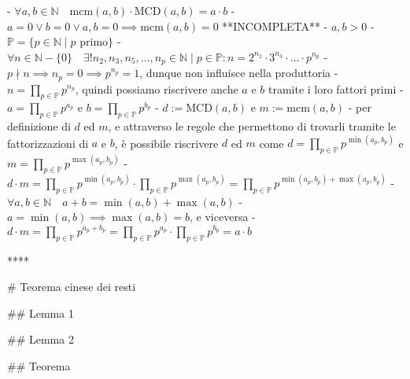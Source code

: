 - $\forall a, b \in \mathbb{N} \quad \textrm{mcm}(a, b) \cdot \textrm{MCD}(a, b) = a \cdot b$
  - $a = 0 \lor b = 0 \lor a, b = 0 \implies \textrm{mcm}(a, b) = 0$ **INCOMPLETA**
  - $a, b \gt 0$
    - $\mathbb{P} = \{p \in \mathbb{N} \mid p \textrm{ primo}\}$
    - $\forall n \in \mathbb{N} - \{0\} \quad \exists ! n_2, n_3, n_5, \ldots, n_p \in \mathbb{N} \mid p \in \mathbb{P} : n = 2^{n_2} \cdot 3 ^ {n_3} \cdot \ldots \cdot p ^ {n_p}$
      - $p \nmid n \implies n_p = 0 \implies p ^  {n_p} = 1$, dunque non influisce nella produttoria
    - $\displaystyle{n = \prod_{p \in \mathbb{P}}^{} p ^{n_p}}$, quindi possiamo riscrivere anche $a$ e $b$ tramite i loro fattori primi
      - \(\displaystyle{a=\prod_{p \in \mathbb{P}} p^{a_{p}}} \) e \( \displaystyle{b=\prod_{p \in \mathbb{P}} p^{b_{p}} }\)
    - $d:= \textrm{MCD}(a, b)$ e $m:=\textrm{mcm}(a, b)$
      - per definizione di $d$ ed $m$, e attraverso le regole che permettono di trovarli tramite le fattorizzazioni di $a$ e $b$, è possibile riscrivere $d$ ed $m$ come $\displaystyle{d = \prod_{p \in \mathbb{P}} p^{\min(a_p, b_p)}}$ e $\displaystyle{m = \prod_{p \in \mathbb{P}} p^{\max(a_p, b_p)}}$
      - $d \cdot m =\displaystyle{\prod_{p \in \mathbb{P}} p^{\min(a_p, b_p)}} \cdot \displaystyle{\prod_{p \in \mathbb{P}} p^{\max(a_p, b_p)}} = \displaystyle{\prod_{p \in \mathbb{P}} p^{\min(a_p, b_p) + \max(a_p, b_p)}}$
    - $\forall a, b \in \mathbb{N} \quad a + b = \min(a, b) + \max(a, b)$
      - $a = \min(a, b) \implies \max(a, b) = b$, e viceversa
    - $d \cdot m = \displaystyle{\prod_{p \in \mathbb{P} }p ^{a_p + b_p}} = \displaystyle{\prod_{p \in \mathbb{P}} p^{a_p}} \cdot \displaystyle{\prod_{p \in \mathbb{P}} p^{b_p}} = a \cdot b$

****

# Teorema cinese dei resti

## Lemma 1

## Lemma 2

## Teorema

